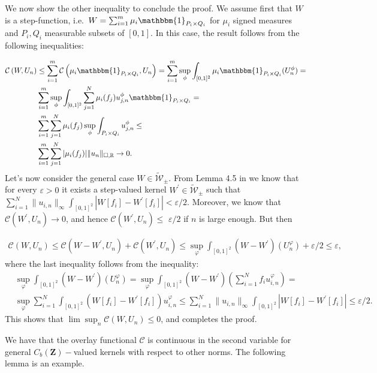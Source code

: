 \documentclass[11pt]{article}
\def\R{\mathbb{R}}
\newcommand{\cC}{{\mathcal C}}  %
\newcommand{\Space}{\mathbf{Z}}
\newcommand{\signed}{\pm}
\newcommand{\CbFunct}{C_b(\Space)}
\newcommand{\UKernel}{\widetilde{\mathcal{W}}_{\signed}}
\begin{document}
We now show the other inequality to conclude the proof. We assume first that $W$ is a step-function, i.e.\ $W=\sum_{i=1}^m \mu_i \mathbbm{1}_{P_i \times Q_i}$ for $\mu_i$ signed measures and $P_i,Q_i$ measurable subsets of $[0,1].$ In this case, the result follows from the following inequalities: 

$$
\begin{aligned}
\mathcal{C}\left(W,U_n\right) & \leq \sum_{i=1}^m \mathcal{C}\left( \mu_i \mathbbm{1}_{P_i \times Q_i},U_n\right)=\sum_{i=1}^m\sup_{\phi}\int_{[0,1]^2}\mu_i \mathbbm{1}_{P_i \times Q_i}(U^{\phi}_n) = \\ & \sum_{i=1}^m\sup_{\phi}\int_{[0,1]^2}\sum^N_{j=1}\mu_i(f_j ) u^{\phi}_{j,n}\mathbbm{1}_{P_i \times Q_i}=\\
& 
\sum_{i=1}^m\sum^N_{j=1}\mu_i(f_j )\sup_{\phi}\int_{P_i \times Q_i} u^{\phi}_{j,n} \leq \\
&
\sum_{i=1}^m\sum^N_{j=1}|\mu_i(f_j )|\|u_n\|_{\square,\R}
\rightarrow 0 .
\end{aligned}
$$
Let's now consider the general case $W\in \UKernel.$ From Lemma 4.5 in \cite{abraham2023probabilitygraphons} we know that for every $\varepsilon>0$ it exists a step-valued kernel $W^{\prime}\in \UKernel$ such that $\sum^N_{i=1}\|u_{i,n}\|_{\infty}\int_{[0,1]^2}|W[f_i]-W^{\prime}[f_i]|<\varepsilon/2.$
Moreover, we know that $\mathcal{C}\left(W^{\prime},U_n\right) \rightarrow 0$, and hence $\mathcal{C}\left(W^{\prime},U_n\right) \leq$ $\varepsilon / 2$ if $n$ is large enough. But then

$$\begin{aligned}
\mathcal{C}\left( W,U_n\right) \leq \mathcal{C}\left(W-W^{\prime},U_n\right)+\mathcal{C}\left( W^{\prime},U_n\right) \leq\sup_{\varphi}\int_{[0,1]^2}(W-W^{\prime})(U^{\varphi}_n)+\varepsilon / 2 \leq \varepsilon ,
\end{aligned}
$$
where the last inequality follows from the inequality:
$$\begin{aligned}
&\sup_{\varphi}\int_{[0,1]^2}(W-W^{\prime})(U^{\varphi}_n)=\sup_{\varphi}\int_{[0,1]^2}(W-W^{\prime})(\sum^N_{i=1}f_iu^{\varphi}_{i,n})=\\
&\sup_{\varphi}\sum^N_{i=1}\int_{[0,1]^2}(W[f_i]-W^{\prime}[f_i])u^{\varphi}_{i,n}\leq \sum^N_{i=1}\|u_{i,n}\|_{\infty}\int_{[0,1]^2}|W[f_i]-W^{\prime}[f_i]|\leq \varepsilon/2.
\end{aligned}
$$
This shows that $\lim \sup _n \mathcal{C}\left( W,U_n\right) \leq 0$, and completes the proof.
\endproof

We have that the overlay functional $\cC$ is continuous in the second variable for general $\CbFunct-$valued kernels with respect to other norms. The following lemma is an example.
\end{document}

